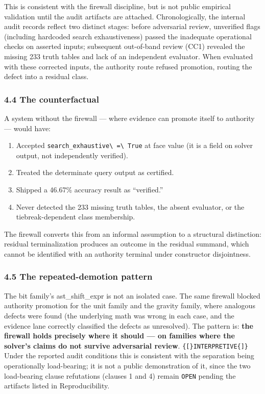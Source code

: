 \documentclass[
  10pt,
]{article}
\providecommand{\tightlist}{%
  \setlength{\itemsep}{0pt}\setlength{\parskip}{0pt}}
\providecommand{\tightlist}{%
  \setlength{\itemsep}{0pt}\setlength{\parskip}{0pt}}
\DeclareRobustCommand{\texttt}[1]{{\paperSymbolFont\nolinkurl{#1}}}
\begin{document}
This is consistent with the firewall discipline, but is not public empirical validation until the audit artifacts are attached. Chronologically, the internal audit records reflect two distinct stages: before adversarial review, unverified flags (including hardcoded search exhaustiveness) passed the inadequate operational checks on asserted inputs; subsequent out-of-band review (CC1) revealed the missing 233 truth tables and lack of an independent evaluator. When evaluated with these corrected inputs, the authority route refused promotion, routing the defect into a residual class.

\subsubsection{4.4 The counterfactual}\label{the-counterfactual}

A system without the firewall --- where evidence can promote itself to authority --- would have:

\begin{enumerate}
\def\labelenumi{\arabic{enumi}.}
\tightlist
\item
  Accepted \texttt{search\_exhaustive\ =\ True} at face value (it is a field on solver output, not independently verified).
\item
  Treated the determinate query output as certified.
\item
  Shipped a 46.67\% accuracy result as ``verified.''
\item
  Never detected the 233 missing truth tables, the absent evaluator, or the tiebreak-dependent class membership.
\end{enumerate}

The firewall converts this from an informal assumption to a structural distinction: residual terminalization produces an outcome in the residual summand, which cannot be identified with an authority terminal under constructor disjointness.

\subsubsection{4.5 The repeated-demotion pattern}\label{the-repeated-demotion-pattern}

The bit family's ast\_shift\_expr is not an isolated case. The same firewall blocked authority promotion for the unit family and the gravity family, where analogous defects were found (the underlying math was wrong in each case, and the evidence lane correctly classified the defects as unresolved). The pattern is: \textbf{the firewall holds precisely where it should --- on families where the solver's claims do not survive adversarial review}. \texttt{{[}INTERPRETIVE{]}} Under the reported audit conditions this is consistent with the separation being operationally load-bearing; it is not a public demonstration of it, since the two load-bearing clause refutations (clauses 1 and 4) remain \texttt{OPEN} pending the artifacts listed in Reproducibility.
\end{document}
